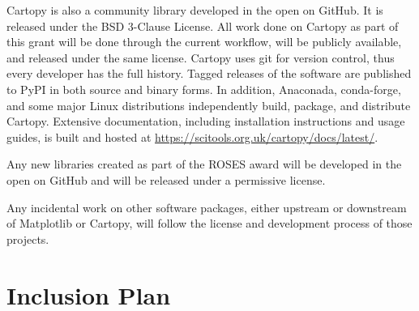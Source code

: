 \documentclass[12pt]{article}
\numberwithin{page}{section}
\begin{document}
Cartopy is also a community library developed in the open on GitHub.  It is released
under the BSD 3-Clause License.  All work done on Cartopy as part of this grant
will be done through the current workflow, will be publicly available, and
released under the same license.  Cartopy uses git for version control, thus
every developer has the full history.  Tagged releases of the software are published to PyPI
in both source and binary forms.
In addition, Anaconada, conda-forge, and some major Linux
distributions independently build, package, and distribute Cartopy.
Extensive documentation, including installation instructions and usage
guides, is built and hosted at
\url{https://scitools.org.uk/cartopy/docs/latest/}.

Any new libraries created as part of the ROSES award will be developed
in the open on GitHub and will be released under a permissive license.

Any incidental work on other software packages, either upstream or
downstream of Matplotlib or Cartopy, will follow the license and development
process of those projects.

\newpage

\section{Inclusion Plan}
\setcounter{page}{1}
\end{document}
